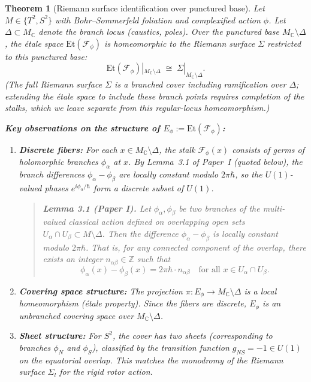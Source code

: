 \documentclass[11pt]{article}
\newtheorem{theorem}{Theorem}[section]
\begin{document}
\begin{theorem}[Riemann surface identification over punctured base]
\label{thm:main}
Let $M \in \{T^2, S^2\}$ with Bohr--Sommerfeld foliation and complexified
action $\phi$. Let $\Delta \subset M_\mathbb{C}$ denote the branch locus
(caustics, poles). Over the punctured base $M_\mathbb{C} \setminus \Delta$,
the \'etale space $\mathrm{Et}(\mathcal{F}_\phi)$ is homeomorphic to the
Riemann surface $\Sigma$ restricted to this punctured base:
\[
  \mathrm{Et}(\mathcal{F}_\phi)|_{M_\mathbb{C}\setminus\Delta}
  \;\cong\;
  \Sigma|_{M_\mathbb{C}\setminus\Delta}.
\]
(The full Riemann surface $\Sigma$ is a branched cover including ramification over $\Delta$; extending the \'etale space to include these branch points requires completion of the stalks, which we leave separate from this regular-locus homeomorphism.)

\textbf{Key observations on the structure of $E_\phi := \mathrm{Et}(\mathcal{F}_\phi)$:}
\begin{enumerate}
\item \textbf{Discrete fibers:} For each $x \in M_\mathbb{C} \setminus \Delta$,
      the stalk $\mathcal{F}_\phi(x)$ consists of germs of holomorphic branches
      $\phi_\alpha$ at $x$. By Lemma~3.1 of Paper~I (quoted below), the
      branch differences $\phi_\alpha - \phi_\beta$ are locally constant
      modulo $2\pi\hbar$, so the $U(1)$-valued phases
      $e^{i\phi_\alpha/\hbar}$ form a \emph{discrete subset} of $U(1)$.

\begin{quote}
\textbf{Lemma 3.1 (Paper I).} Let $\phi_\alpha, \phi_\beta$ be two branches of the multi-valued classical action defined on overlapping open sets $U_\alpha \cap U_\beta \subset M \setminus \Delta$. Then the difference $\phi_\alpha - \phi_\beta$ is locally constant modulo $2\pi\hbar$. That is, for any connected component of the overlap, there exists an integer $n_{\alpha\beta} \in \mathbb{Z}$ such that
\[
  \phi_\alpha(x) - \phi_\beta(x) = 2\pi\hbar \cdot n_{\alpha\beta}
  \quad \text{for all } x \in U_\alpha \cap U_\beta.
\]
\end{quote}

\item \textbf{Covering space structure:} The projection
      $\pi: E_\phi \to M_\mathbb{C} \setminus \Delta$ is a local homeomorphism
      (\'etale property). Since the fibers are discrete, $E_\phi$ is an unbranched
      \emph{covering space} over $M_\mathbb{C} \setminus \Delta$.

\item \textbf{Sheet structure:} For $S^2$, the cover has two sheets
      (corresponding to branches $\phi_N$ and $\phi_S$), classified by
      the transition function $g_{NS} = -1 \in U(1)$ on the equatorial
      overlap. This matches the monodromy of the Riemann surface $\Sigma_l$
      for the rigid rotor action.
\end{enumerate}


\end{theorem}
\end{document}
